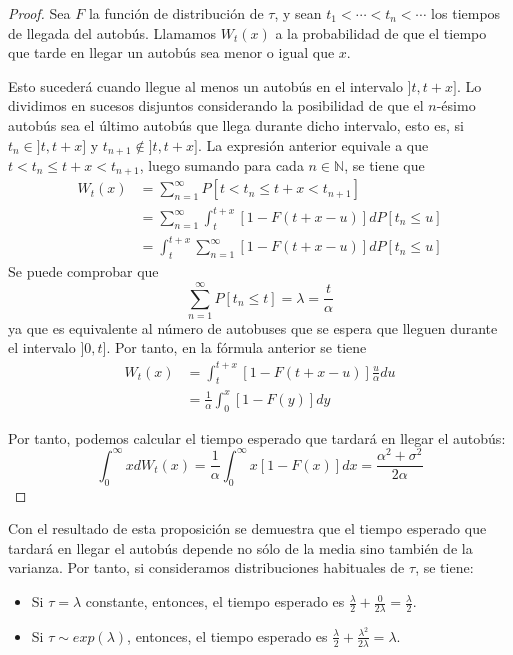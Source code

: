 \documentclass[a4paper,10pt]{scrartcl}
\theoremstyle{definition}
\numberwithin{equation}{section}
\begin{document}
\begin{proof}
  Sea $F$ la función de distribución de $\tau$, y sean $t_1 < \cdots < t_n < \cdots$ los tiempos de llegada del autobús. Llamamos $W_t(x)$ a la probabilidad de que el tiempo que tarde en llegar un autobús sea menor o igual que $x$.

  Esto sucederá cuando llegue al menos un autobús en el intervalo $\rbrack t, t+x\rbrack$. Lo dividimos en sucesos disjuntos considerando la posibilidad de que el $n$-ésimo autobús sea el último autobús que llega durante dicho intervalo, esto es, si $t_n \in \rbrack t, t+x \rbrack$ y $t_{n+1} \notin \rbrack t, t+x \rbrack$. La expresión anterior equivale a que $t < t_n \leq t+x < t_{n+1}$, luego sumando para cada $n \in \mathbb{N}$, se tiene que
  \begin{align*}
    W_t(x) &= \sum_{n=1}^\infty P[t < t_n \leq t+x < t_{n+1}] \\
    &= \sum_{n=1}^\infty \int_t^{t+x} [1-F(t+x-u)]dP[t_n \leq u] \\
    &= \int_t^{t+x} \sum_{n=1}^\infty [1-F(t+x-u)]dP[t_n \leq u]
  \end{align*}
  Se puede comprobar que
  $$ \sum_{n=1}^\infty P[t_n \leq t] = \lambda = \frac{t}{\alpha} $$
  ya que es equivalente al número de autobuses que se espera que lleguen durante el intervalo $\rbrack 0,t \rbrack$.
  Por tanto, en la fórmula anterior se tiene
  \begin{align*}
    W_t(x) &= \int_t^{t+x} [1-F(t+x-u)]\frac{u}{\alpha}du \\
    &= \frac{1}{\alpha}\int_0^x [1-F(y)]dy
  \end{align*}

  Por tanto, podemos calcular el tiempo esperado que tardará en llegar el autobús:
  $$ \int_0^\infty xdW_t(x) = \frac{1}{\alpha}\int_0^\infty x[1-F(x)]dx = \frac{\alpha^2+\sigma^2}{2\alpha}$$
\end{proof}

Con el resultado de esta proposición se demuestra que el tiempo esperado que tardará en llegar el autobús depende no sólo de la media sino también de la varianza. Por tanto, si consideramos distribuciones habituales de $\tau$, se tiene:
\begin{itemize}
\item Si $\tau=\lambda$ constante, entonces, el tiempo esperado es $\frac{\lambda}{2} + \frac{0}{2\lambda} = \frac{\lambda}{2}$.
\item Si $\tau \sim exp(\lambda)$, entonces, el tiempo esperado es $\frac{\lambda}{2} + \frac{\lambda^2}{2\lambda} = \lambda$.
\end{itemize}
\end{document}
